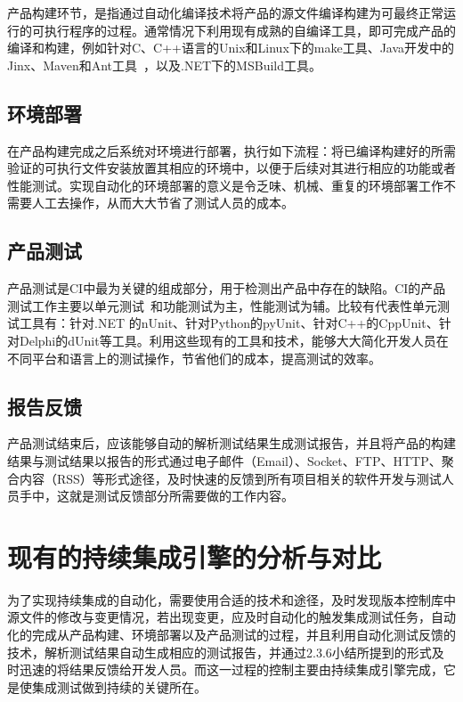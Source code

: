 	产品构建环节，是指通过自动化编译技术将产品的源文件编译构建为可最终正常运行的可执行程序的过程。通常情况下利用现有成熟的自编译工具，即可完成产品的编译和构建，例如针对C、C++语言的Unix和Linux下的make工具、Java开发中的Jinx、Maven和Ant工具~\cite{43, 44, 45}，以及.NET下的MSBuild工具。
	
	\subsection{环境部署}
	
	在产品构建完成之后系统对环境进行部署，执行如下流程：将已编译构建好的所需验证的可执行文件安装放置其相应的环境中，以便于后续对其进行相应的功能或者性能测试。实现自动化的环境部署的意义是令乏味、机械、重复的环境部署工作不需要人工去操作，从而大大节省了测试人员的成本。	
	
	\subsection{产品测试}
	
	产品测试是CI中最为关键的组成部分，用于检测出产品中存在的缺陷。CI的产品测试工作主要以单元测试~\cite{46}和功能测试为主，性能测试为辅。比较有代表性单元测试工具有：针对.NET 的nUnit、针对Python的pyUnit、针对C++的CppUnit、针对Delphi的dUnit等工具。利用这些现有的工具和技术，能够大大简化开发人员在不同平台和语言上的测试操作，节省他们的成本，提高测试的效率。
	
	\subsection{报告反馈}
	
	产品测试结束后，应该能够自动的解析测试结果生成测试报告，并且将产品的构建结果与测试结果以报告的形式通过电子邮件（Email）、Socket、FTP、HTTP、聚合内容（RSS）等形式途径，及时快速的反馈到所有项目相关的软件开发与测试人员手中，这就是测试反馈部分所需要做的工作内容。
	
\section{现有的持续集成引擎的分析与对比}
	
	为了实现持续集成的自动化，需要使用合适的技术和途径，及时发现版本控制库中源文件的修改与变更情况，若出现变更，应及时自动化的触发集成测试任务，自动化的完成从产品构建、环境部署以及产品测试的过程，并且利用自动化测试反馈的技术，解析测试结果自动生成相应的测试报告，并通过2.3.6小结所提到的形式及时迅速的将结果反馈给开发人员。而这一过程的控制主要由持续集成引擎完成，它是使集成测试做到持续的关键所在。
	
